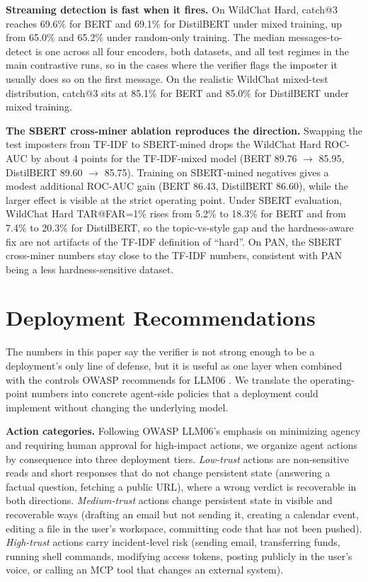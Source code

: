 \documentclass[11pt]{article}
\begin{document}
\noindent\textbf{Streaming detection is fast when it fires.} On WildChat Hard, catch@3 reaches 69.6\% for BERT and 69.1\% for DistilBERT under mixed training, up from 65.0\% and 65.2\% under random-only training. The median messages-to-detect is one across all four encoders, both datasets, and all test regimes in the main contrastive runs, so in the cases where the verifier flags the imposter it usually does so on the first message. On the realistic WildChat mixed-test distribution, catch@3 sits at 85.1\% for BERT and 85.0\% for DistilBERT under mixed training.

\noindent\textbf{The SBERT cross-miner ablation reproduces the direction.} Swapping the test imposters from TF-IDF to SBERT-mined drops the WildChat Hard ROC-AUC by about 4 points for the TF-IDF-mixed model (BERT 89.76 $\rightarrow$ 85.95, DistilBERT 89.60 $\rightarrow$ 85.75). Training on SBERT-mined negatives gives a modest additional ROC-AUC gain (BERT 86.43, DistilBERT 86.60), while the larger effect is visible at the strict operating point. Under SBERT evaluation, WildChat Hard TAR@FAR=1\% rises from 5.2\% to 18.3\% for BERT and from 7.4\% to 20.3\% for DistilBERT, so the topic-vs-style gap and the hardness-aware fix are not artifacts of the TF-IDF definition of ``hard''. On PAN, the SBERT cross-miner numbers stay close to the TF-IDF numbers, consistent with PAN being a less hardness-sensitive dataset.

\section{Deployment Recommendations}
\label{sec:deployment}

The numbers in this paper say the verifier is not strong enough to be a deployment's only line of defense, but it is useful as one layer when combined with the controls OWASP recommends for LLM06 \citep{owasp2025llm}. We translate the operating-point numbers into concrete agent-side policies that a deployment could implement without changing the underlying model.

\noindent\textbf{Action categories.} Following OWASP LLM06's emphasis on minimizing agency and requiring human approval for high-impact actions, we organize agent actions by consequence into three deployment tiers. \textit{Low-trust} actions are non-sensitive reads and short responses that do not change persistent state (answering a factual question, fetching a public URL), where a wrong verdict is recoverable in both directions. \textit{Medium-trust} actions change persistent state in visible and recoverable ways (drafting an email but not sending it, creating a calendar event, editing a file in the user's workspace, committing code that has not been pushed). \textit{High-trust} actions carry incident-level risk (sending email, transferring funds, running shell commands, modifying access tokens, posting publicly in the user's voice, or calling an MCP tool that changes an external system).
\end{document}
